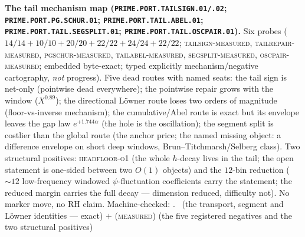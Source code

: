\par\smallskip\noindent\textbf{The tail mechanism map
(\texttt{PRIME.PORT.TAILSIGN.01/\allowbreak .02};
\texttt{PRIME.PORT.PG.\allowbreak SCHUR.01};
\texttt{PRIME.PORT.TAIL.\allowbreak ABEL.01};
\texttt{PRIME.PORT.TAIL.\allowbreak SEGSPLIT.01};
\texttt{PRIME.PORT.TAIL.\allowbreak OSCPAIR.01}).}
Six probes ($14/14 + 10/10 + 20/20 + 22/22 + 24/24 + 22/22$;
\textsc{tailsign-measured}, \textsc{tailrepair-measured},
\textsc{pgschur-measured}, \textsc{tailabel-measured},
\textsc{segsplit-measured}, \textsc{oscpair-measured}; embedded
byte-exact; typed explicitly mechanism/negative cartography,
\emph{not} progress).  Five dead routes with named seats: the
tail sign is net-only (pointwise dead everywhere); the
pointwise repair grows with the window ($X^{0.89}$); the
directional L\"owner route loses two orders of magnitude
(floor-vs-inverse mechanism); the cumulative/Abel route is
exact but its envelope leaves the gap law $e^{+1.744\alpha}$
(the hole is the oscillation); the segment split is costlier
than the global route (the anchor price; the named missing
object: a difference envelope on short deep windows,
Brun--Titchmarsh/Selberg class).  Two structural positives:
\textsc{headfloor-o1} (the whole $h$-decay lives in the tail;
the open statement is one-sided between two $O(1)$ objects) and
the $12$-bin reduction (${\sim}12$ low-frequency windowed
$\psi$-fluctuation coefficients carry the statement; the
reduced margin carries the full decay --- dimension reduced,
difficulty not).  No marker move, no RH claim.
Machine-checked: .
\mE\ (the transport, segment and L\"owner identities --- exact)
$+$ (\textsc{measured}) (the five registered negatives and the
two structural positives)
\par\smallskip


